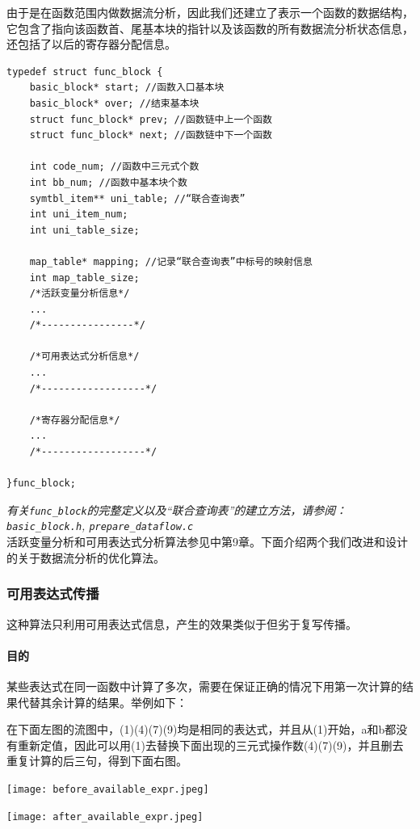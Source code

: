 由于是在函数范围内做数据流分析，因此我们还建立了表示一个函数的数据结构，它包含了指向该函数首、尾基本块的指针以及该函数的所有数据流分析状态信息，还包括了以后的寄存器分配信息。
\begin{lstlisting}
typedef struct func_block {
	basic_block* start; //函数入口基本块
	basic_block* over; //结束基本块
	struct func_block* prev; //函数链中上一个函数
	struct func_block* next; //函数链中下一个函数

	int code_num; //函数中三元式个数
	int bb_num; //函数中基本块个数
	symtbl_item** uni_table; //“联合查询表”
	int uni_item_num;
	int uni_table_size;
	
	map_table* mapping; //记录“联合查询表”中标号的映射信息
	int map_table_size;	
	/*活跃变量分析信息*/
	... 
	/*----------------*/
	
	/*可用表达式分析信息*/
	...
	/*------------------*/
	
	/*寄存器分配信息*/
	...
	/*------------------*/

}func_block;
\end{lstlisting}
{\it \anchor 有关\verb|func_block|的完整定义以及“联合查询表”的建立方法，请参阅：\verb|basic_block.h|, \verb|prepare_dataflow.c|}\\

活跃变量分析和可用表达式分析算法参见\cite{sunjiasu}中第9章。下面介绍两个我们改进和设计的关于数据流分析的优化算法。
\subsubsection{可用表达式传播}
这种算法只利用可用表达式信息，产生的效果类似于但劣于复写传播。

\paragraph*{目的}某些表达式在同一函数中计算了多次，需要在保证正确的情况下用第一次计算的结果代替其余计算的结果。举例如下：

在下面左图的流图中，(1)(4)(7)(9)均是相同的表达式，并且从(1)开始，a和b都没有重新定值，因此可以用(1)去替换下面出现的三元式操作数(4)(7)(9)，并且删去重复计算的后三句，得到下面右图。
\begin{center}
\begin{minipage}{0.4\textwidth}
\begin{center}
	\texttt{[image: before\_available\_expr.jpeg]}
\end{center}
\end{minipage}
\begin{minipage}{0.4\textwidth}
\begin{center}
	\texttt{[image: after\_available\_expr.jpeg]}
\end{center}
\end{minipage}
\end{center}

